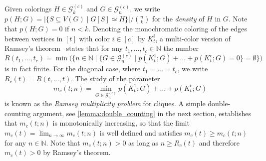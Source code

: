 \documentclass[a4paper,11pt]{article}
\numberwithin{equation}{section}
\newcommand{\mG}{\mathcal{G}}
\newcommand{\NN}{\mathbb{N}}
\begin{document}
Given colorings $H \in \mG_k^{(c)}$ and $G \in \mG_n^{(c)}$, we write $p(H; G) = |\{ S \subseteq V(G) \mid G[S] \simeq H\}| / {n \choose k}$ for the \emph{density} of $H$ in $G$. Note that $p(H;G) = 0$ if $n < k$. Denoting the monochromatic coloring of the edges between vertices in $[t]$ with color $i \in [c]$ by $K_t^i$, a multi-color version of Ramsey's theorem~\cite{ramsey1987problem} states that for any $t_1, \ldots, t_c \in \NN$ the number
%
\begin{equation*}
    R(t_1, \ldots, t_c) = \min \big( \big\{n \in \NN \mid \{ G \in \mG_n^{(c)} \mid p(K_t^1; G) + \ldots + p(K_t^c; G) = 0 \} = \emptyset \big\} \big)
\end{equation*}
%
is in fact finite. For the diagonal case, where $t_1 = \ldots = t_c$, we write $R_c(t) = R(t, \ldots, t)$. The study of the parameter
%
\begin{equation*}
    m_c(t; n) = \min_{G \in \mG_n^{(c)}} p(K_t^1; G) + \ldots + p(K_t^c; G)
\end{equation*}
%
is known as the \emph{Ramsey multiplicity problem} for cliques.  A simple double-counting argument, see \cref{lemma:double_counting} in the next section, establishes that $m_c(t; n)$ is monotonically increasing, so that the limit $m_c(t) = \lim_{n \to \infty} m_c(t; n)$ is well defined and satisfies $m_c(t) \geq m_c(t; n)$ for any $n \in \NN$. Note that $m_c(t; n) > 0$ as long as $n \geq R_c(t)$ and therefore $m_c(t) > 0$ by Ramsey's theorem.
\end{document}
